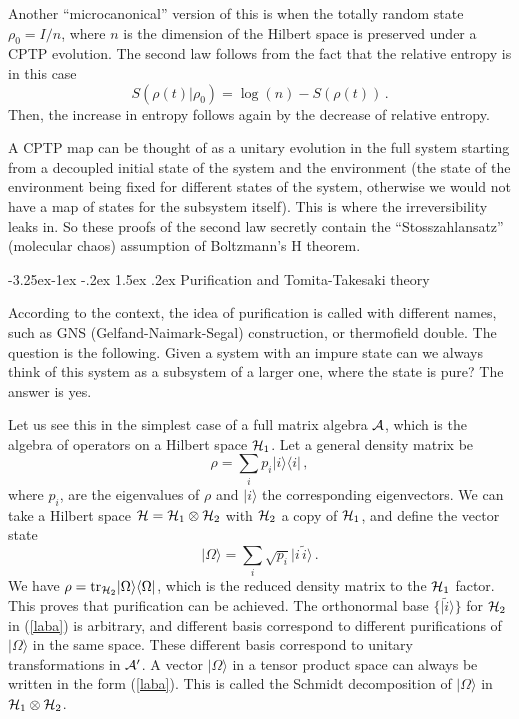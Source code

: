 \documentclass[11pt]{article}
\makeatletter
\renewcommand\subsection{\@startsection{subsection}{2}{\z@}%
                                   {-3.25ex\@plus -1ex \@minus -.2ex}%
                                     {1.5ex \@plus .2ex}%
                                     {\normalfont\bfseries}}
\numberwithin{equation}{section}
\newcommand{\be}{\begin{equation}}
\newcommand{\ee}{\end{equation}}
\makeatother
\begin{document}
Another ``microcanonical'' version of this is
when the totally random state $\rho_0=I/n$, where $n$ is the dimension of the
Hilbert space is preserved under a CPTP evolution. 
 The second law follows from the fact that
the relative entropy is in this case
\begin{equation}
S(\rho(t)|\rho_0)=\log(n)-S(\rho(t))\,.
\end{equation}
Then, the increase in entropy follows again by the decrease of relative entropy.

A CPTP map can be thought of as a unitary evolution in the full system starting from a decoupled initial state of the system and the environment (the state of the environment being fixed for different states of the system, otherwise we would not have a map of states for the subsystem itself). This is where the irreversibility leaks in. So these proofs of the second law secretly contain the ``Stosszahlansatz'' (molecular chaos) assumption of Boltzmann's H theorem.     


\subsection{Purification and Tomita-Takesaki theory}
\label{tt}

According to the context, the idea of purification is called with different names, such as GNS (Gelfand-Naimark-Segal) construction, or thermofield double. The question is the following. Given a system with an impure state can we always think of this system as a subsystem of a larger one, where the state is pure? The answer is yes. 

Let us see this in the simplest case of a full matrix algebra ${\cal A}$, which is the algebra of operators on a Hilbert space ${\cal H}_1$. Let a general density matrix be 
\be
\rho=\sum_i p_i |i\rangle \langle i |\,,\label{dm}
\ee
 where $p_i$, are the eigenvalues of $\rho$ and $|i\rangle$ the corresponding eigenvectors. We can take a Hilbert space ${\cal H}={\cal H}_1\otimes {\cal H}_2$ with ${\cal H}_2$ a copy of ${\cal H}_1$, and define the vector state 
\begin{equation}
\vert \Omega \rangle = \sum_i \sqrt{p_i}  \vert i \,\tilde{i}\rangle\,.\label{laba}
\end{equation}
We have $\rho=\textrm{tr}_{{\cal H}_2}\vert \Omega\rangle \langle \Omega \vert$, which is the reduced density matrix to the ${\cal H}_1$ factor. This proves that purification can be achieved. 
The orthonormal base $\{\vert\tilde{i}\rangle\}$ for ${\cal H}_2$ in (\ref{laba}) is arbitrary, and different basis correspond to different purifications of $\vert \Omega \rangle$ in the same space. These different basis correspond to unitary transformations in ${\cal A}'$. A vector $\vert \Omega\rangle$ in a tensor product space can always be written in the form (\ref{laba}). This is called the Schmidt decomposition of $\vert \Omega \rangle$ in ${\cal H}_1\otimes {\cal H}_2$.
\end{document}
